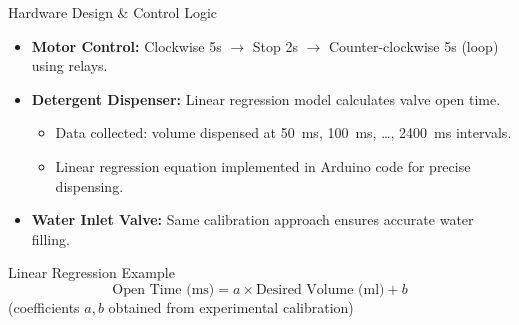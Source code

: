 \documentclass[aspectratio=169]{beamer}
\begin{document}
\begin{frame}{Hardware Design \& Control Logic}
\begin{itemize}
    \item \textbf{Motor Control:} Clockwise 5s $\rightarrow$ Stop 2s $\rightarrow$ Counter-clockwise 5s (loop) using relays.
    \item \textbf{Detergent Dispenser:} Linear regression model calculates valve open time.
    \begin{itemize}
        \item Data collected: volume dispensed at 50~ms, 100~ms, \dots, 2400~ms intervals.
        \item Linear regression equation implemented in Arduino code for precise dispensing.
    \end{itemize}
    \item \textbf{Water Inlet Valve:} Same calibration approach ensures accurate water filling.
\end{itemize}
\vspace{0.3cm}
\begin{block}{Linear Regression Example}
\[
\text{Open Time (ms)} = a \times \text{Desired Volume (ml)} + b
\]
\small (coefficients $a,b$ obtained from experimental calibration)
\end{block}
\end{frame}
\end{document}
